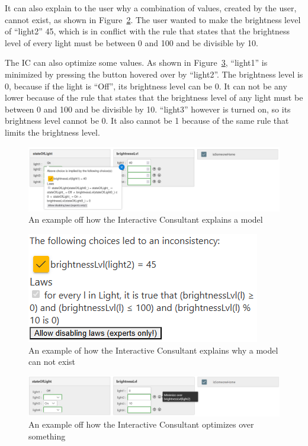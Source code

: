 \documentclass[11pt,a4paper]{report}
\begin{document}
It can also explain to the user why a combination of values, created by the user, cannot exist, as shown in Figure~\ref{fig:IDP-Z3_interactive-consultant_error-example}. The user wanted to make the brightness level of ``light2'' 45, which is in conflict with the rule that states that the brightness level of every light must be between 0 and 100 and be divisible by 10.

The IC can also optimize some values. As shown in Figure~\ref{fig:IDP-Z3_interactive-consultant_optimization-example}, ``light1'' is minimized by pressing the button hovered over by ``light2''. The brightness level is 0, because if the light is ``Off'', its brightness level can be 0. It can not be any lower because of the rule that states that the brightness level of any light must be between 0 and 100 and be divisible by 10. ``light3'' however is turned on, so its brightness level cannot be 0. It also cannot be 1 because of the same rule that limits the brightness level.

\begin{figure}
    \centering
    \includegraphics[width=0.8\linewidth]{images/IDP-Z3_interactive-consultant_light-example.png}
    \caption{An example off how the Interactive Consultant explains a model}
    \label{fig:IDP-Z3_interactive-consultant_light-example}
\end{figure}

\begin{figure}
    \centering
    \includegraphics[width=0.4\linewidth]{images/IDP-Z3_interactive-consultant_error-example.png}
    \caption{An example of how the Interactive Consultant explains why a model can not exist}
    \label{fig:IDP-Z3_interactive-consultant_error-example}
\end{figure}

\begin{figure}
    \centering
    \includegraphics[width=0.8\linewidth]{images/IDP-Z3_interactive-consultant_optimization-example.png}
    \caption{An example off how the Interactive Consultant optimizes over something}
    \label{fig:IDP-Z3_interactive-consultant_optimization-example}
\end{figure}
\end{document}
